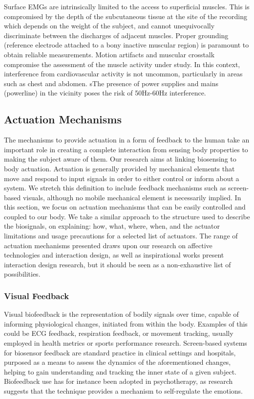 Surface EMGs are intrinsically limited to the access to superficial muscles. This is compromised by the depth of the subcutaneous tissue at the site of the recording which depends on the weight of the subject, and cannot unequivocally discriminate between the discharges of adjacent muscles.
Proper grounding (reference electrode attached to a bony inactive muscular region) is paramount to obtain reliable measurements. Motion artifacts and muscular crosstalk compromise the assessment of the muscle activity under study. In this context, interference from cardiovascular activity is not uncommon, particularly in areas such as chest and abdomen. sThe presence of power supplies and mains (powerline) in the vicinity poses the risk of 50Hz-60Hz interference.

\subsection{Actuation Mechanisms}

The mechanisms to provide actuation in a form of feedback to the human take an important role in creating a complete interaction from sensing body properties to making the subject aware of them. Our research aims at linking biosensing to body actuation. Actuation is generally provided by mechanical elements that move and respond to input signals in order to either control or inform about a system. We stretch this definition to include feedback mechanisms such as screen-based visuals, although no mobile mechanical element is necessarily implied. In this section, we focus on actuation mechanisms that can be easily controlled and coupled to our body. We take a similar approach to the structure used to describe the biosignals, on explaining: how, what, where, when, and the actuator limitations and usage precautions for a selected list of actuators. The range of actuation mechanisms presented draws upon our research on affective technologies and interaction design, as well as inspirational works present interaction design research, but it should be seen as a non-exhaustive list of possibilities.

\subsubsection{Visual Feedback}

Visual biofeedback is the representation of bodily signals over time, capable of informing physiological changes, initiated from within the body. Examples of this could be ECG feedback, respiration feedback, or movement tracking, usually employed in health metrics or sports performance research. Screen-based systems for biosensor feedback are standard practice in clinical settings and hospitals, purposed as a means to assess the dynamics of the aforementioned changes, helping to gain understanding and tracking the inner state of a given subject. Biofeedback use has for instance been adopted in psychotherapy, as research suggests that the technique provides a mechanism to self-regulate the emotions.

